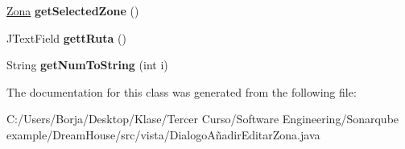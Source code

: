 \begin{DoxyCompactItemize}
\mbox{\label{classvista_1_1_dialogo_a_xC3_xB1adir_editar_zona_a0d9cc9f81e61823751e28641da9834f1}} 
\mbox{\hyperlink{classmodelo_1_1_zona}{Zona}} {\bfseries get\+Selected\+Zone} ()
\item 
\mbox{\label{classvista_1_1_dialogo_a_xC3_xB1adir_editar_zona_a8916fda5ffd99498a6260218cf310aa2}} 
J\+Text\+Field {\bfseries gett\+Ruta} ()
\item 
\mbox{\label{classvista_1_1_dialogo_a_xC3_xB1adir_editar_zona_a43768ac16ac5a29ae9c6064065c0cb02}} 
String {\bfseries get\+Num\+To\+String} (int i)
\end{DoxyCompactItemize}


The documentation for this class was generated from the following file\+:\begin{DoxyCompactItemize}
\item 
C\+:/\+Users/\+Borja/\+Desktop/\+Klase/\+Tercer Curso/\+Software Engineering/\+Sonarqube example/\+Dream\+House/src/vista/Dialogo\+Añadir\+Editar\+Zona.\+java\end{DoxyCompactItemize}
